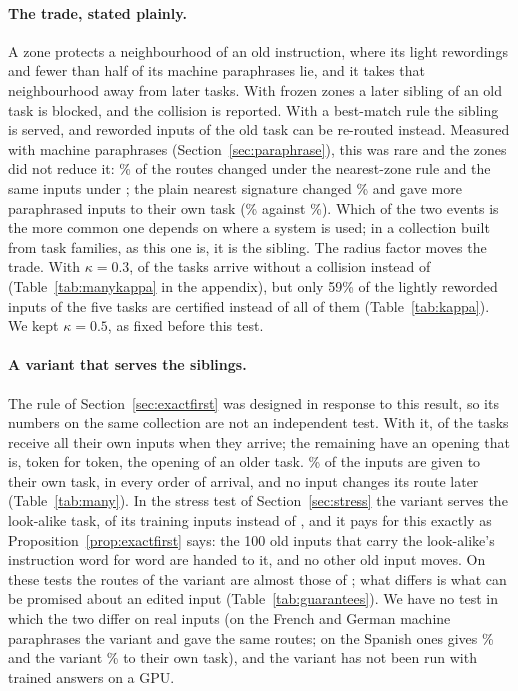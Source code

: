 \paragraph{The trade, stated plainly.} A zone protects a neighbourhood of an old instruction, where its light rewordings and fewer than half of its machine paraphrases lie, and it takes that neighbourhood away from later tasks. With
frozen zones a later sibling of an old task is blocked, and the collision is reported. With a best-match rule the
sibling is served, and reworded inputs of the old task can be re-routed instead. Measured with machine paraphrases (Section~\ref{sec:paraphrase}), this was rare and the zones did not reduce it:
\RerouteNearChanged{}\% of the routes changed under the nearest-zone rule and the same \RerouteCertNChanged{} inputs under \cert{}; the plain nearest signature changed \RerouteSigChanged{}\% and gave more paraphrased inputs to their own task (\RerouteSigOwnEnd{}\% against \RerouteCertOwnEnd{}\%). Which of the two
events is the more common one depends on where a system is used; in a collection built from task
families, as this one is, it is the sibling. The radius factor moves the trade. With
$\kappa = 0.3$, \ManyCleanKappaThree{} of the \ManyTasks{} tasks arrive without a collision
instead of \ManyClean{} (Table~\ref{tab:manykappa} in the appendix), but only 59\% of the lightly
reworded inputs of the five tasks are certified instead of all of them (Table~\ref{tab:kappa}). We
kept $\kappa = 0.5$, as fixed before this test.

\paragraph{A variant that serves the siblings.} The rule \exactfirst{} of
Section~\ref{sec:exactfirst} was designed in response to this result, so its numbers on the same
collection are not an independent test. With it, \ExactTasksOwn{} of the \ManyTasks{} tasks receive
all their own inputs when they arrive; the remaining \ExactTasksNone{} have an opening that is, token for token, the opening of an older
task. \ExactRightPct{}\% of the inputs are given to their own task, in every order
of arrival, and no input changes its route later (Table~\ref{tab:many}). In the stress test of
Section~\ref{sec:stress} the variant serves the look-alike task, \ExactStressOwn{} of its
\StressTrain{} training inputs instead of \CertStressOwn{}, and it pays for this exactly as
Proposition~\ref{prop:exactfirst} says: the 100 old inputs that carry the look-alike's instruction
word for word are handed to it, and no other old input moves. On these tests the routes of the
variant are almost those of \nearest{}; what differs is what can be promised about an edited input
(Table~\ref{tab:guarantees}). We have no test in which the two differ on real inputs (on the French and German machine paraphrases the variant and \nearest{} gave the same routes; on the Spanish ones \nearest{} gives \RerouteNearEsOwn{}\% and the variant \RerouteExactEsOwn{}\% to their own task), and the
variant has not been run with trained answers on a GPU.


